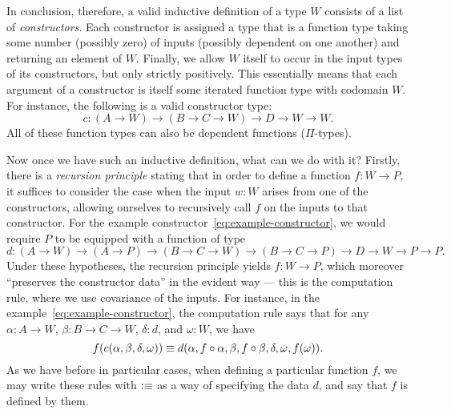 In conclusion, therefore, a valid inductive definition of a type $W$ consists of a list of \emph{constructors}.
Each constructor is assigned a type that is a function type taking some number (possibly zero) of inputs (possibly dependent on one another) and returning an element of $W$.
Finally, we allow $W$ itself to occur in the input types of its constructors, but only strictly positively.
This essentially means that each argument of a constructor is itself some iterated function type with codomain $W$.
For instance, the following is a valid constructor type:
\begin{equation}
  c:(A\to W) \to (B\to C \to W) \to D \to W \to W.\label{eq:example-constructor}
\end{equation}
All of these function types can also be dependent functions ($\Pi$-types).

Now once we have such an inductive definition, what can we do with it?
Firstly, there is a \emph{recursion principle} stating that in order to define a function $f:W\to P$, it suffices to consider the case when the input $w:W$ arises from one of the constructors, allowing ourselves to recursively call $f$ on the inputs to that constructor.
For the example constructor~\eqref{eq:example-constructor}, we would require $P$ to be equipped with a function of type
\begin{equation}\label{eq:example-rechyp}
  d:(A\to W) \to (A\to P) \to (B\to C\to W) \to (B\to C \to P) \to D \to W \to P \to P.
\end{equation}
Under these hypotheses, the recursion principle yields $f:W\to P$, which moreover ``preserves the constructor data'' in the evident way --- this is the computation rule, where we use covariance of the inputs.
For instance, in the example~\eqref{eq:example-constructor}, the computation rule says that for any $\alpha:A\to W$, $\beta:B\to C\to W$, $\delta:d$, and $\omega:W$, we have
\begin{equation}
  f(c(\alpha,\beta,\delta,\omega)) \jdeq d(\alpha,f\circ \alpha,\beta, f\circ \beta, \delta, \omega,f(\omega)).\label{eq:example-comp}
\end{equation}
As we have before in particular cases, when defining a particular function $f$, we may write these rules with $\vcentcolon\equiv$ as a way of specifying the data $d$, and say that $f$ is defined by them.

